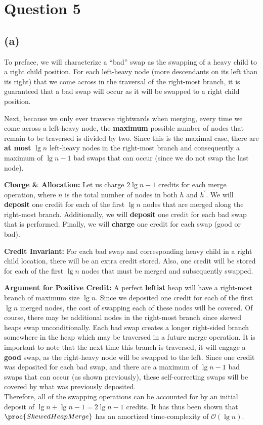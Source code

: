\section{Question 5}
\subsection{(a)}

To preface, we will characterize a ``bad'' swap as the swapping of a heavy child to a right child position.
For each left-heavy node (more descendants on its left than its right) that we come across in
the traversal of the right-most branch, it is guaranteed that a bad swap will occur as it will be swapped to a right child position.\vspace{3mm}

Next, because we only ever traverse rightwards when merging, every time we come across a left-heavy node, the \textbf{maximum} possible number
of nodes that remain to be traversed is divided by two.
Since this is the maximal case, there are \textbf{at most} $\lg{n}$ left-heavy nodes in the right-most branch and consequently a maximum of $\lg{n} - 1$ bad swaps that can occur (since we do not swap the last node).\vspace{3mm}

\textbf{Charge \& Allocation:} Let us charge $2\lg{n} - 1$ credits for each merge operation, where $n$ is the total number of nodes in both $h$ and $h^\prime$.
We will \textbf{deposit} one credit for each of the first $\lg{n}$ nodes that are merged along the right-most branch.
Additionally, we will \textbf{deposit} one credit for each bad swap that is performed.
Finally, we will \textbf{charge} one credit for each swap (good or bad).

\textbf{Credit Invariant:} For each bad swap and corresponding heavy child in a right child location,
there will be an extra credit stored. Also, one credit will be stored for each of the first $\lg{n}$ nodes that must be merged and subsequently swapped.

\textbf{Argument for Positive Credit:}
A perfect \textbf{leftist} heap will have a right-most branch of maximum size $\lg{n}$.
Since we deposited one credit for each of the first $\lg{n}$ merged nodes,
the cost of swapping each of these nodes will be covered.
Of course, there may be additional nodes in the right-most branch since skewed heaps swap unconditionally.
Each bad swap creates a longer right-sided branch somewhere in the heap which may be traversed in a future merge operation.
It is important to note that the next time this branch is traversed, it will engage a \textbf{good} swap, as the right-heavy node will be swapped to the left.
Since one credit was deposited for each bad swap, and there are a maximum of $\lg{n} - 1$ bad swaps that can occur (as shown previously),
these self-correcting swaps will be covered by what was previously deposited.\\
Therefore, all of the swapping operations can be accounted
for by an initial deposit of $\lg{n} + \lg{n} - 1 = 2\lg{n} - 1$ credits.
It has thus been shown that $\proc{SkewedHeapMerge}$ has an amortized time-complexity of $\mathcal{O}(\lg{n})$.

